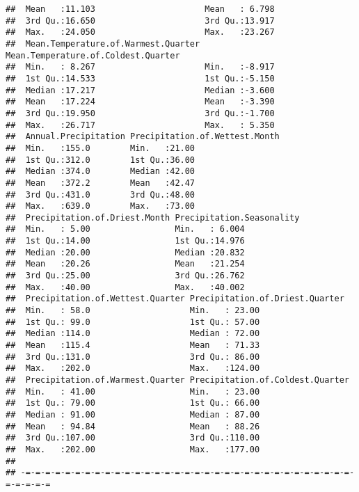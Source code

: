 \documentclass[]{article}
\begin{document}
\begin{verbatim}
##  Mean   :11.103                      Mean   : 6.798                    
##  3rd Qu.:16.650                      3rd Qu.:13.917                    
##  Max.   :24.050                      Max.   :23.267                    
##  Mean.Temperature.of.Warmest.Quarter Mean.Temperature.of.Coldest.Quarter
##  Min.   : 8.267                      Min.   :-8.917                     
##  1st Qu.:14.533                      1st Qu.:-5.150                     
##  Median :17.217                      Median :-3.600                     
##  Mean   :17.224                      Mean   :-3.390                     
##  3rd Qu.:19.950                      3rd Qu.:-1.700                     
##  Max.   :26.717                      Max.   : 5.350                     
##  Annual.Precipitation Precipitation.of.Wettest.Month
##  Min.   :155.0        Min.   :21.00                 
##  1st Qu.:312.0        1st Qu.:36.00                 
##  Median :374.0        Median :42.00                 
##  Mean   :372.2        Mean   :42.47                 
##  3rd Qu.:431.0        3rd Qu.:48.00                 
##  Max.   :639.0        Max.   :73.00                 
##  Precipitation.of.Driest.Month Precipitation.Seasonality
##  Min.   : 5.00                 Min.   : 6.004           
##  1st Qu.:14.00                 1st Qu.:14.976           
##  Median :20.00                 Median :20.832           
##  Mean   :20.26                 Mean   :21.254           
##  3rd Qu.:25.00                 3rd Qu.:26.762           
##  Max.   :40.00                 Max.   :40.002           
##  Precipitation.of.Wettest.Quarter Precipitation.of.Driest.Quarter
##  Min.   : 58.0                    Min.   : 23.00                 
##  1st Qu.: 99.0                    1st Qu.: 57.00                 
##  Median :114.0                    Median : 72.00                 
##  Mean   :115.4                    Mean   : 71.33                 
##  3rd Qu.:131.0                    3rd Qu.: 86.00                 
##  Max.   :202.0                    Max.   :124.00                 
##  Precipitation.of.Warmest.Quarter Precipitation.of.Coldest.Quarter
##  Min.   : 41.00                   Min.   : 23.00                  
##  1st Qu.: 79.00                   1st Qu.: 66.00                  
##  Median : 91.00                   Median : 87.00                  
##  Mean   : 94.84                   Mean   : 88.26                  
##  3rd Qu.:107.00                   3rd Qu.:110.00                  
##  Max.   :202.00                   Max.   :177.00                  
## 
## -=-=-=-=-=-=-=-=-=-=-=-=-=-=-=-=-=-=-=-=-=-=-=-=-=-=-=-=-=-=-=-=-=-=-=-=-=-=
\end{verbatim}
\end{document}
